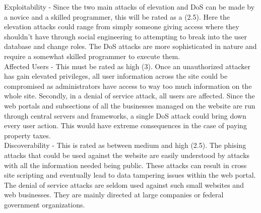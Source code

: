 \documentclass[paper=a4, fontsize=11pt]{scrartcl} %
\numberwithin{equation}{section} %
\numberwithin{figure}{section} %
\numberwithin{table}{section} %
\begin{document}
Exploitability - Since the two main attacks of elevation and DoS can be made by a novice and a skilled programmer, this
will be rated as a (2.5). Here the elevation attacks could range from simply someone giving access where they shouldn't
have through social engineering to attempting to break into the user database and change roles. The DoS attacks are more
sophisticated in nature and require a somewhat skilled programmer to execute them.\\

Affected Users - This must be rated as high (3). Once an unauthorized attacker has gain elevated privileges, all user
information across the site could be compromised as administrators have access to way too much information on the whole
site. Secondly, in a denial of service attack, all users are affected. Since the web portals and subsections of all the
businesses managed on the website are run through central servers and frameworks, a single DoS attack could bring down
every user action. This would have extreme consequences in the case of paying property taxes.\\

Discoverability - This is rated as between medium and high (2.5). The phising attacks that could be used against the 
website are easily understood by attacks with all the information needed being public. These attacks can result in
cross site scripting and eventually lead to data tampering issues within the web portal. The denial of service attacks
are seldom used against such small websites and web businesses. They are mainly directed at large companies or federal
government organizations. 
\end{document}
